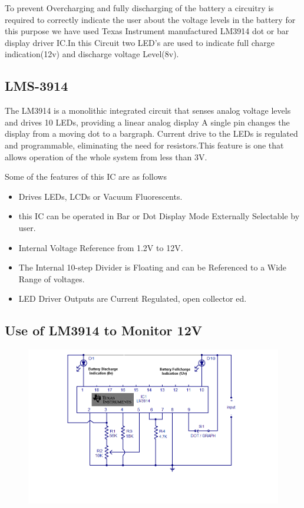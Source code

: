 \documentclass[11pt,a4paper]{article}
\begin{document}
	To prevent Overcharging and fully discharging of the battery a  circuitry is required to correctly indicate the user about the voltage levels in the battery for this purpose we have used Texas Instrument manufactured LM3914 dot or bar display driver IC.In this Circuit two LED's are used to indicate full charge indication(12v) and discharge voltage Level(8v).
	
	
	\subsection{LMS-3914}
	The LM3914 is a monolithic integrated circuit that senses analog voltage levels and drives 10 LEDs,	providing a linear analog display A single pin changes the display from a moving dot to a bargraph. Current drive to the LEDs is regulated and programmable, eliminating the need for resistors.This feature is one that allows operation of the whole system from less than 3V.



Some of the features of this IC are as follows	
\begin{itemize}
\item Drives LEDs, LCDs or Vacuum Fluorescents.
\item this IC can be operated in Bar or Dot Display Mode Externally Selectable by user.
\item Internal Voltage Reference from 1.2V to 12V.
\item The Internal 10-step Divider is Floating and can be Referenced to a Wide Range of voltages.
\item LED Driver Outputs are Current Regulated, open collector ed.
\end{itemize}

	\subsection{Use of LM3914 to Monitor 12V}

	\begin{figure}[h!]
		\includegraphics[scale=0.5]{3914.jpg}
		\centering
	\end{figure}
\end{document}
